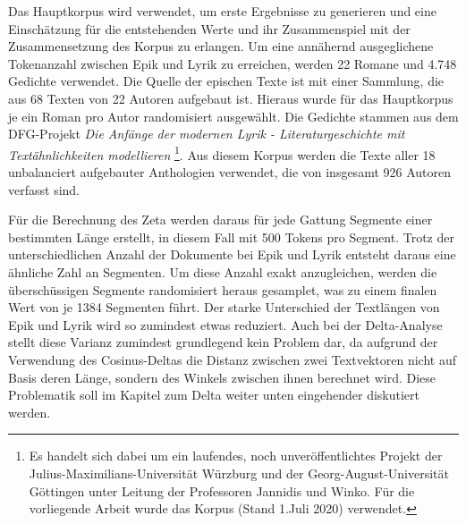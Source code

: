\documentclass[a4paper,10p]{article}
\begin{document}
Das Hauptkorpus wird verwendet, um erste Ergebnisse zu generieren und eine Einschätz\-ung für die entstehenden Werte und ihr Zusammenspiel mit der Zusammensetzung des Korpus zu erlangen. Um eine annähernd ausgeglichene Tokenanzahl zwischen Epik und Lyrik zu erreichen, werden 22 Romane und 4.748 Gedichte verwendet. Die Quelle der epischen Texte ist \citep{ComputationalStylisticsGroup} mit einer Sammlung, die aus 68 Texten von 22 Autoren aufgebaut ist. Hieraus wurde für das Hauptkorpus je ein Roman pro Autor randomisiert ausgewählt. Die Gedichte stammen aus dem DFG-Projekt \textit{Die Anfänge der modernen Lyrik - Literaturgeschichte mit Textähnlichkeiten modellieren} \footnote{Es handelt sich dabei um ein laufendes, noch unveröffentlichtes Projekt der Julius-Maximilians-Universität Würzburg und der Georg-August-Universität Göttingen unter Leitung der Professoren Jannidis und Winko. Für die vorliegende Arbeit wurde das Korpus (Stand 1.Juli 2020) verwendet.}. Aus diesem Korpus werden die Texte aller 18 unbalanciert aufgebauter Anthologien verwendet, die von insgesamt 926 Autoren verfasst sind. \par 

Für die Berechnung des Zeta werden daraus für jede Gattung Segmente einer bestimmten Länge erstellt, in diesem Fall mit 500 Tokens pro Segment. Trotz der unterschiedlichen Anzahl der Dokumente bei Epik und Lyrik entsteht daraus eine ähnliche Zahl an Segmenten. Um diese Anzahl exakt anzugleichen, werden die überschüssigen Segmente randomisiert heraus gesamplet, was zu einem finalen Wert von je 1384 Segmenten führt. Der starke Unterschied der Textlängen von Epik und Lyrik wird so zumindest etwas reduziert. Auch bei der Delta-Analyse stellt diese Varianz zumindest grundlegend kein Problem dar, da aufgrund der Verwendung des Cosinus-Deltas die Distanz zwischen zwei Textvektoren nicht auf Basis deren Länge, sondern des Winkels zwischen ihnen berechnet wird. Diese Problematik soll im Kapitel zum Delta weiter unten eingehender diskutiert werden. \par 
\end{document}
